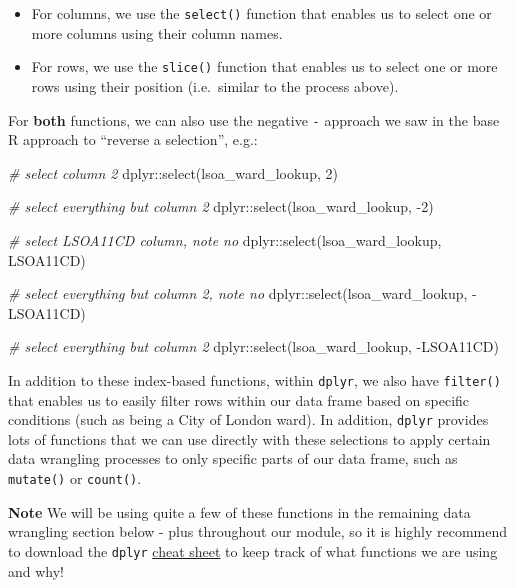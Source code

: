 \documentclass[
]{book}
\newenvironment{Shaded}{\begin{snugshade}}{\end{snugshade}}
\newcommand{\CommentTok}[1]{\textcolor[rgb]{0.56,0.35,0.01}{\textit{#1}}}
\newcommand{\DecValTok}[1]{\textcolor[rgb]{0.00,0.00,0.81}{#1}}
\newcommand{\FunctionTok}[1]{\textcolor[rgb]{0.00,0.00,0.00}{#1}}
\newcommand{\NormalTok}[1]{#1}
\newcommand{\SpecialCharTok}[1]{\textcolor[rgb]{0.00,0.00,0.00}{#1}}
\providecommand{\tightlist}{%
  \setlength{\itemsep}{0pt}\setlength{\parskip}{0pt}}
\begin{document}
\begin{itemize}
\tightlist
\item
  For columns, we use the \texttt{select()} function that enables us to select one or more columns using their column names.
\item
  For rows, we use the \texttt{slice()} function that enables us to select one or more rows using their position (i.e.~similar to the process above).
\end{itemize}

For \textbf{both} functions, we can also use the negative \texttt{-} approach we saw in the base R approach to ``reverse a selection'', e.g.:

\begin{Shaded}
\begin{Highlighting}[]
\CommentTok{\# select column 2}
\NormalTok{dplyr}\SpecialCharTok{::}\FunctionTok{select}\NormalTok{(lsoa\_ward\_lookup, }\DecValTok{2}\NormalTok{)}

\CommentTok{\# select everything but column 2}
\NormalTok{dplyr}\SpecialCharTok{::}\FunctionTok{select}\NormalTok{(lsoa\_ward\_lookup, }\SpecialCharTok{{-}}\DecValTok{2}\NormalTok{)}

\CommentTok{\# select LSOA11CD column, note no \textquotesingle{}\textquotesingle{}}
\NormalTok{dplyr}\SpecialCharTok{::}\FunctionTok{select}\NormalTok{(lsoa\_ward\_lookup, LSOA11CD)}

\CommentTok{\# select everything but column 2, note no \textquotesingle{}\textquotesingle{}}
\NormalTok{dplyr}\SpecialCharTok{::}\FunctionTok{select}\NormalTok{(lsoa\_ward\_lookup, }\SpecialCharTok{{-}}\NormalTok{LSOA11CD)}

\CommentTok{\# select everything but column 2}
\NormalTok{dplyr}\SpecialCharTok{::}\FunctionTok{select}\NormalTok{(lsoa\_ward\_lookup, }\SpecialCharTok{{-}}\NormalTok{LSOA11CD)}
\end{Highlighting}
\end{Shaded}

In addition to these index-based functions, within \texttt{dplyr}, we also have \texttt{filter()} that enables us to easily filter rows within our data frame based on specific conditions (such as being a City of London ward). In addition, \texttt{dplyr} provides lots of functions that we can use directly with these selections to apply certain data wrangling processes to only specific parts of our data frame, such as \texttt{mutate()} or \texttt{count()}.

\textbf{Note}
We will be using quite a few of these functions in the remaining data wrangling section below - plus throughout our module, so it is highly recommend to download the \texttt{dplyr} \href{https://github.com/rstudio/cheatsheets/raw/master/data-transformation.pdf}{cheat sheet} to keep track of what functions we are using and why!
\end{document}
